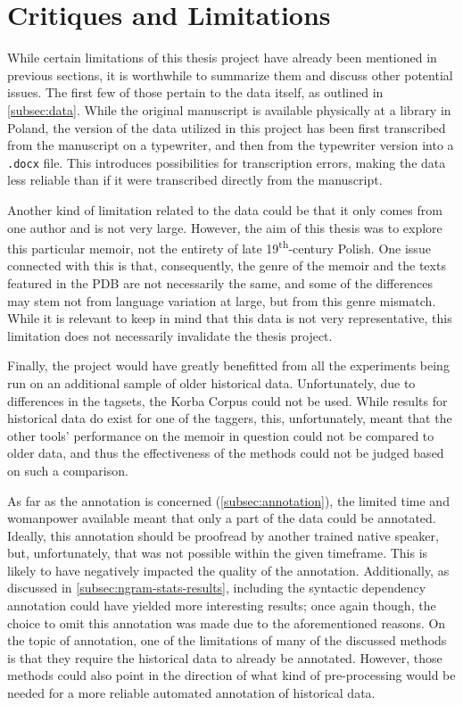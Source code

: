 \section{Critiques and Limitations}
\label{sec:critiques}

While certain limitations of this thesis project have already been mentioned in previous sections, it is worthwhile to summarize them and discuss other potential issues. The first few of those pertain to the data itself, as outlined in \autoref{subsec:data}. While the original manuscript is available physically at a library in Poland, the version of the data utilized in this project has been first transcribed from the manuscript on a typewriter, and then from the typewriter version into a \texttt{.docx} file. This introduces possibilities for transcription errors, making the data less reliable than if it were transcribed directly from the manuscript. 

Another kind of limitation related to the data could be that it only comes from one author and is not very large. However, the aim of this thesis was to explore this particular memoir, not the entirety of late 19\textsuperscript{th}-century Polish. One issue connected with this is that, consequently, the genre of the memoir and the texts featured in the PDB are not necessarily the same, and some of the differences may stem not from language variation at large, but from this genre mismatch. While it is relevant to keep in mind that this data is not very representative, this limitation does not necessarily invalidate the thesis project.

Finally, the project would have greatly benefitted from all the experiments being run on an additional sample of older historical data. Unfortunately, due to differences in the tagsets, the Korba Corpus could not be used. While results for historical data do exist for one of the taggers, this, unfortunately, meant that the other tools' performance on the memoir in question could not be compared to older data, and thus the effectiveness of the methods could not be judged based on such a comparison.

As far as the annotation is concerned (\autoref{subsec:annotation}), the limited time and womanpower available meant that only a part of the data could be annotated. Ideally, this annotation should be proofread by another trained native speaker, but, unfortunately, that was not possible within the given timeframe. This is likely to have negatively impacted the quality of the annotation. Additionally, as discussed in \autoref{subsec:ngram-stats-results}, including the syntactic dependency annotation could have yielded more interesting results; once again though, the choice to omit this annotation was made due to the aforementioned reasons. On the topic of annotation, one of the limitations of many of the discussed methods is that they require the historical data to already be annotated. However, those methods could also point in the direction of what kind of pre-processing would be needed for a more reliable automated annotation of historical data.

